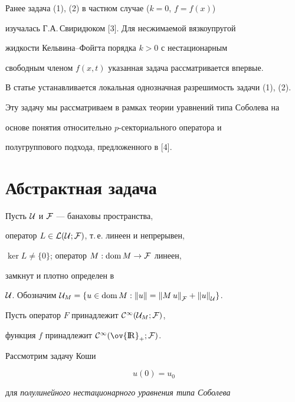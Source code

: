 Ранее задача (1), (2) в частном случае ($k=0$, $f=f(x)$)


изучалась Г.А.\,Свиридюком [3]. Для несжимаемой вязкоупругой 


жидкости Кельвина--Фойгта порядка $k>0$ с нестационарным


свободным членом $f(x,t)$ указанная задача рассматривается впервые.





В статье устанавливается локальная однозначная разрешимость задачи (1), (2).


Эту задачу мы рассматриваем в рамках теории уравнений типа Соболева на 


основе понятия относительно $p$-секториального оператора и 


полугруппового подхода, предложенного в [4].








\section{Абстрактная задача}





Пусть ${\cal U}$ и ${\cal F}$ --- банаховы пространства,


оператор $L \in {\cal L}


({\cal U};{\cal F})$, т.\,е. линеен и непрерывен,


$\ker L \ne \{0 \}$; оператор $M:\operatorname{dom} M \to {\cal F}$ линеен,


замкнут и плотно определен в


${\cal U}$. Обозначим ${\cal U}_M=


\{u \in \dom M :\| u \|={\|M\,u \|}_{\cal F}+{\| u \|}_{\cal U}\}$.


Пусть оператор $F$ принадлежит ${\cal C}^{\infty}({\cal U}_M;{\cal F})$,


функция $f$ принадлежит ${\cal C}^{\infty}(\ov {\R}_+;{\cal F})$.





Рассмотрим задачу Коши


\begin{equation}


u(0)=u_0


\end{equation}


для {\it полулинейного нестационарного уравнения типа Соболева}


